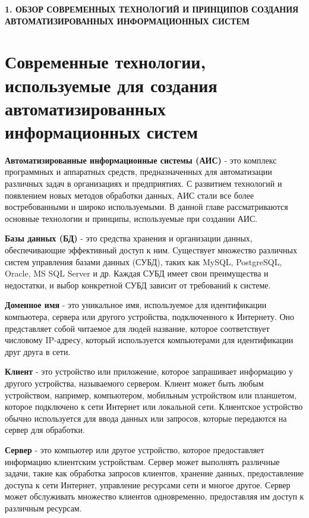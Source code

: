 \newpage
\begin{center}
    \textbf{\large 1. ОБЗОР СОВРЕМЕННЫХ ТЕХНОЛОГИЙ И ПРИНЦИПОВ СОЗДАНИЯ АВТОМАТИЗИРОВАННЫХ ИНФОРМАЦИОННЫХ СИСТЕМ}
\end{center}


\section{Современные технологии, используемые для создания автоматизированных информационных систем}

\textbf{Автоматизированные информационные системы (АИС)} - это комплекс программных и аппаратных средств,
предназначенных для автоматизации различных задач в организациях и предприятиях.
С развитием технологий и появлением новых методов обработки данных,
АИС стали все более востребованными и широко используемыми.
В данной главе рассматриваются основные технологии и принципы, используемые при создании АИС.

\textbf{Базы данных (БД)} - это средства хранения и организации данных,
обеспечивающие эффективный доступ к ним. Существует множество различных систем управления базами данных (СУБД),
таких как MySQL, PostgreSQL, Oracle, MS SQL Server и др.
Каждая СУБД имеет свои преимущества и недостатки, и выбор конкретной СУБД зависит от требований к системе.

\textbf{Доменное имя} - это уникальное имя, используемое для идентификации компьютера, сервера или другого устройства, подключенного к Интернету.
Оно представляет собой читаемое для людей название, которое соответствует числовому IP-адресу,
который используется компьютерами для идентификации друг друга в сети.

\textbf{Клиент} - это устройство или приложение, которое запрашивает информацию у другого устройства, называемого сервером. 
Клиент может быть любым устройством, например, компьютером, мобильным устройством или планшетом, 
которое подключено к сети Интернет или локальной сети. 
Клиентское устройство обычно используется для ввода данных или запросов, 
которые передаются на сервер для обработки.

\textbf{Сервер} - это компьютер или другое устройство, которое предоставляет информацию клиентским устройствам. 
Сервер может выполнять различные задачи, такие как обработка запросов клиентов, 
хранение данных, предоставление доступа к сети Интернет, управление ресурсами сети и многое другое.
Сервер может обслуживать множество клиентов одновременно, предоставляя им доступ к различным ресурсам.

